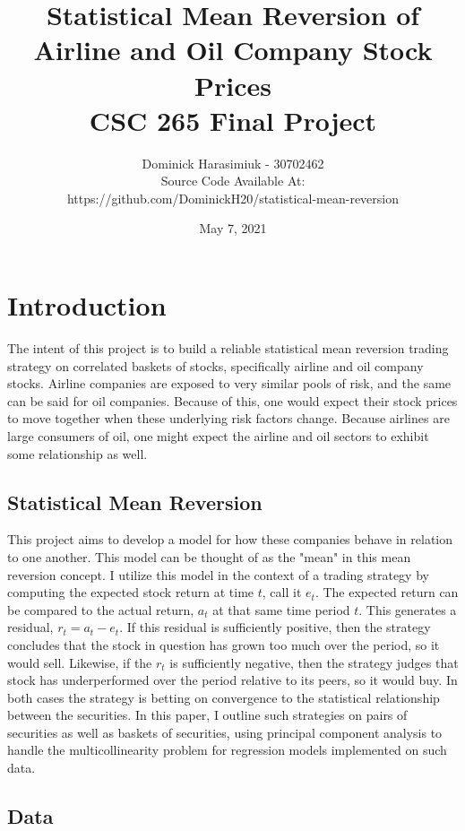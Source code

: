 \documentclass{article}
\title{Statistical Mean Reversion of \\
Airline and Oil Company Stock Prices \\
\large CSC 265 Final Project}
\author{Dominick Harasimiuk - 30702462\\
Source Code Available At:\\ 
https://github.com/DominickH20/statistical-mean-reversion}
\date{May 7, 2021}
\begin{document}
\maketitle

\vspace{1cm}

\begin{abstract}
\noindent
\lipsum[1]
\end{abstract}

\newpage
\section{Introduction}
The intent of this project is to build a reliable statistical mean reversion trading strategy
on correlated baskets of stocks, specifically airline and oil company stocks. Airline companies
are exposed to very similar pools of risk, and the same can be said for oil companies. Because
of this, one would expect their stock prices to move together when these underlying risk
factors change. Because airlines are large consumers of oil, one might expect the airline and
oil sectors to exhibit some relationship as well.
\subsection{Statistical Mean Reversion}
This project aims to develop a model for how these companies behave in relation
to one another. This model can be thought of as the "mean" in this mean reversion concept. I
utilize this model in the context of a trading strategy by computing the expected stock return 
at time $t$, call it $e_t$. The expected return can be compared to the actual return, $a_t$
at that same time period $t$. This generates a residual, $r_t = a_t - e_t$. If this residual
is sufficiently positive, then the strategy concludes that the stock in question has grown too 
much over the period, so it would sell. Likewise, if the $r_t$ is sufficiently negative, then the 
strategy judges that stock has underperformed over the period relative to its peers, so it would buy. In both cases
the strategy is betting on convergence to the statistical relationship between the securities.
In this paper, I outline such strategies on pairs of securities as well as baskets of securities,
using principal component analysis to handle the multicollinearity problem for regression
models implemented on such data.

\subsection{Data}
\end{document}

